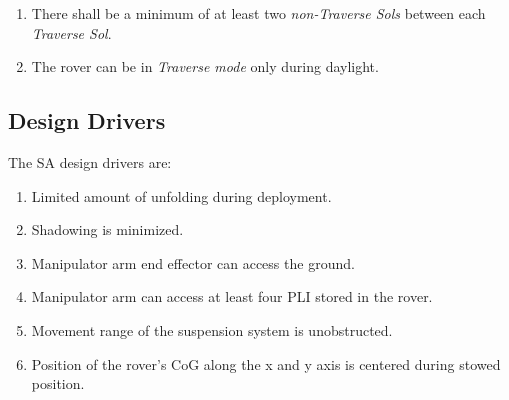 \resetLeadingZeroCounter
\begin{enumerate}[leftmargin=1.47cm, label=\zeroLeadCounter{C}]
    \item There shall be a minimum of at least two \textit{non-Traverse Sols} between each \textit{Traverse Sol}.
    \item \label{itm:con:daylight_traverse} The rover can be in \textit{Traverse mode} only during daylight.
\end{enumerate}

\subsection{Design Drivers}
\label{sec:Design:RequirementsAndDesignDrivers:DesignDrivers}
The \ac{SA} design drivers are:

\resetLeadingZeroCounter
\begin{enumerate}[leftmargin=1.51cm, label=\zeroLeadCounter{D}]
    \item \label{itm:dd:limited_unfolding} Limited amount of unfolding during deployment.
    \item \label{itm:dd:shadowing} Shadowing is minimized.
    \item \label{itm:dd:end_effector} Manipulator arm end effector can access the ground.
    \item \label{itm:dd:four_plis} Manipulator arm can access at least four \ac{PLI} stored in the rover.
    \item \label{itm:dd:unobstructed} Movement range of the suspension system is unobstructed.
    \item \label{itm:dd:cog} Position of the rover's \ac{CoG} along the x and y axis is centered during stowed position.
\end{enumerate}

